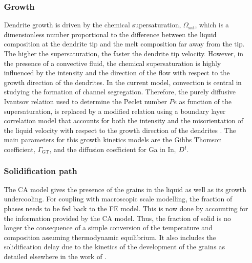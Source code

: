 \subsubsection{Growth}
Dendrite growth is driven by the chemical supersaturation, $\Omega_\text{sat}$, which is a 
dimensionless number proportional to the difference between the liquid composition at the dendrite 
tip and the melt composition far away from the tip. The higher the supersaturation, the faster the 
dendrite tip velocity. However, in the presence of a convective fluid, the chemical supersaturation 
is highly influenced by the intensity and the direction of the flow with respect to the growth direction 
of the dendrites. In the current model, convection is central in studying the formation of channel segregation. Therefore, 
the purely diffusive Ivantsov relation used to determine the Peclet number $Pe$ as function of the supersaturation, 
is replaced by a modified relation using a boundary layer correlation model that accounts for both the intensity 
and the misorientation of the liquid velocity with respect to the growth direction of the dendrites \citep{gandin_boundary_2003}. 
The main parameters for this growth kinetics models are the Gibbs Thomson coefficient, $\Gamma_{\text{GT}}$, and the diffusion 
coefficient for Ga in In, $D^l$.

\subsubsection{Solidification path}
The CA model gives the presence of the grains in the liquid as well as its growth undercooling. 
For coupling with macroscopic scale modelling, the fraction of phases needs to be fed back to the 
FE model. This is now done by accounting for the information provided by the CA model. Thus, the 
fraction of solid is no longer the consequence of a simple conversion of the temperature and 
composition assuming thermodynamic equilibrium. It also includes the solidification delay due to 
the kinetics of the development of the grains as detailed elsewhere in the work of \citet{carozzani_direct_2013}.


